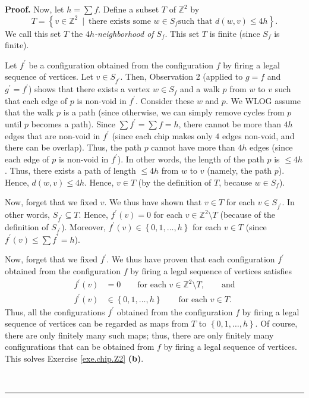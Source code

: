 \documentclass[numbers=enddot,12pt,final,onecolumn,notitlepage]{scrartcl}%
\theoremstyle{definition}
\newenvironment{proof}[1][Proof]{\noindent\textbf{#1.} }{\ \rule{0.5em}{0.5em}}
\let\sumnonlimits\sum
\renewcommand{\sum}{\sumnonlimits\limits}
\begin{document}
\begin{proof}
Now, let $h=\sum f$. Define a subset $T$ of $\mathbb{Z}^{2}$ by%
\[
T=\left\{  v\in\mathbb{Z}^{2}\ \mid\ \text{there exists some }w\in S_{f}\text{
such that }d\left( w, v \right)  \leq4h\right\}  .
\]
We call this set $T$ the $4h$\textit{-neighborhood of }$S_{f}$. This set $T$
is finite (since $S_{f}$ is finite).

Let $f^{\prime}$ be a configuration obtained from the configuration $f$ by
firing a legal sequence of vertices. Let $v\in S_{f^{\prime}}$. Then,
Observation 2 (applied to $g=f$ and $g^{\prime}=f^{\prime}$) shows that there
exists a vertex $w\in S_{f}$ and a walk $p$ from $w$ to $v$ such that each
edge of $p$ is non-void in $f^{\prime}$. Consider these $w$ and $p$. We WLOG
assume that the walk $p$ is a path (since otherwise, we can simply remove
cycles from $p$ until $p$ becomes a path). Since $\sum f^{\prime}=\sum f=h$,
there cannot be more than $4h$ edges that are non-void in $f^{\prime}$ (since
each chip makes only $4$ edges non-void, and there can be overlap). Thus, the
path $p$ cannot have more than $4h$ edges (since each edge of $p$ is non-void
in $f^{\prime}$). In other words, the length of the path $p$ is $\leq4h$.
Thus, there exists a path of length $\leq4h$ from $w$ to $v$ (namely, the path
$p$). Hence, $d\left(  w,v\right)  \leq4h$.
Hence, $v\in T$ (by the definition of $T$, because $w\in S_{f}$).

Now, forget that we fixed $v$. We thus have shown that $v\in T$ for each $v\in
S_{f^{\prime}}$. In other words, $S_{f^{\prime}}\subseteq T$. Hence,
$f^{\prime}\left(  v\right)  =0$ for each $v\in\mathbb{Z}^{2}\setminus T$
(because of the definition of $S_{f^{\prime}}$).
Moreover, $f^{\prime}\left(  v\right)  \in\left\{  0,1,\ldots,h\right\}  $ for
each $v\in T$ (since $f^{\prime}\left(  v\right)  \leq\sum f^{\prime}=h$).

Now, forget that we fixed $f^{\prime}$. We thus have proven that each
configuration $f^{\prime}$ obtained from the configuration $f$ by firing a
legal sequence of vertices satisfies
\begin{align*}
f^{\prime}\left(  v\right)   &  =0\qquad \text{for each }%
v\in\mathbb{Z}^{2}\setminus T,\qquad \text{and}\\
f^{\prime}\left(  v\right)   &  \in\left\{  0,1,\ldots,h\right\}
\qquad \text{for each }v\in T.
\end{align*}
Thus, all the configurations $f^{\prime}$ obtained from the configuration $f$ by
firing a legal sequence of vertices can be regarded as maps from $T$ to
$\left\{  0,1,\ldots,h\right\}  $. Of course, there are only finitely many
such maps; thus, there are only finitely many configurations that can be
obtained from $f$ by firing a legal sequence of vertices. This solves Exercise
\ref{exe.chip.Z2} \textbf{(b)}.


\end{proof}
\end{document}
